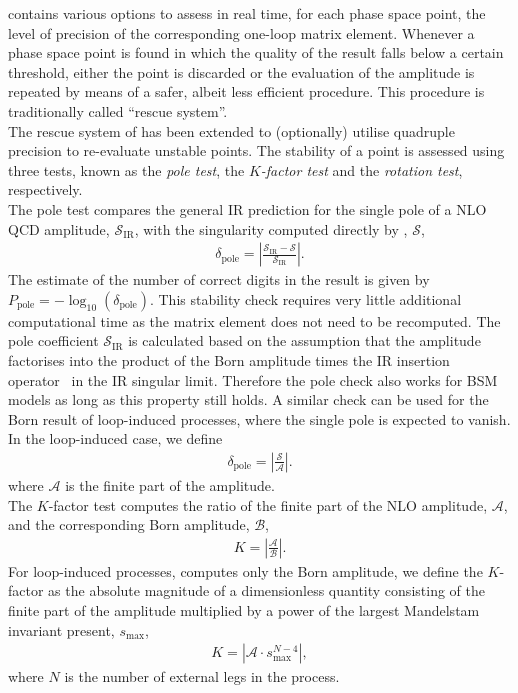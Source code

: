 \gosam{} contains various options to assess in real time, for each phase space point, 
the level of precision of the corresponding one-loop matrix element. 
Whenever a phase space point is found in which the quality of the result falls below a
certain threshold, either the point is discarded or the evaluation of the amplitude is
repeated by means of a safer, albeit less efficient procedure. This procedure is
traditionally called ``rescue system''.\\

The rescue system of \gosamv has been extended to (optionally) utilise quadruple precision to re-evaluate unstable points. The stability of a point is assessed using three tests, known as the \textit{pole test}, the $K$\textit{-factor test} and the \textit{rotation test}, respectively.\\

The pole test compares the general IR prediction for the single pole of a NLO QCD amplitude, $\mathcal{S}_\mathrm{IR}$, with the singularity computed directly by \gosam, $\mathcal{S}$,
\begin{align}
\delta_\mathrm{pole} = \left| \frac{\mathcal{S}_\mathrm{IR} - \mathcal{S}}{{\mathcal{S}_\mathrm{IR}}} \right|.
\end{align}
The estimate of the number of correct digits in the result is given by $P_\mathrm{pole} = - \log_{10} ( \delta_\mathrm{pole})$.
This stability check requires very little additional computational time as the matrix element does not need to be recomputed.
The pole coefficient ${\mathcal{S}_\mathrm{IR}}$ is calculated based on the assumption that the amplitude factorises into the product of the Born amplitude times the IR insertion operator~\cite{Catani:1996vz,Catani:2002hc} in the IR singular limit. Therefore the pole check also works for BSM models as long as this property still holds. 
A similar check can be used for the Born result of loop-induced processes, where the single pole is expected to vanish.
In the loop-induced case, we define
\begin{align}
\delta_\mathrm{pole} = \left| \frac{\mathcal{S}}{\mathcal{A}} \right|.
\end{align}
where $\mathcal{A}$ is the finite part of the amplitude.\\

The $K$-factor test computes the ratio of the finite part of the NLO amplitude, $\mathcal{A}$, and the corresponding Born amplitude, $\mathcal{B}$,
\begin{align}
K=\left| \frac{\mathcal{A}}{\mathcal{B}} \right|.
\end{align}
For loop-induced processes, \gosam computes only the Born amplitude, we define the $K$-factor as the absolute magnitude of a dimensionless quantity consisting of the finite part of the amplitude multiplied by a power of the largest Mandelstam invariant present, $s_{\max}$,
\begin{align}
K = | \mathcal{A} \cdot s_{\max}^{N-4} |,
\end{align}
where $N$ is the number of external legs in the process.\\


